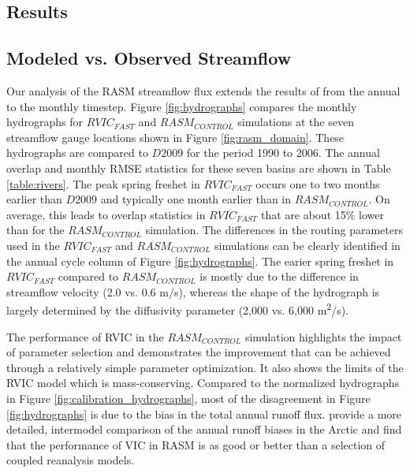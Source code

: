 \documentclass[jgrga, draft]{agutex}
\begin{document}
\begin{article}
\section{Results}
\label{sec:results}

\subsection{Modeled vs. Observed Streamflow}
\label{sec:hydrographs}

Our analysis of the RASM streamflow flux extends the results of \citet{Hamman_2016} from the annual to the monthly timestep.
Figure \ref{fig:hydrographs} compares the monthly hydrographs for $RVIC_{FAST}$ and $RASM_{CONTROL}$ simulations at the seven streamflow gauge locations shown in Figure \ref{fig:rasm_domain}.
These hydrographs are compared to $D2009$ for the period 1990 to 2006.
The annual overlap and monthly RMSE statistics for these seven basins are shown in Table \ref{table:rivers}.
The peak spring freshet in $RVIC_{FAST}$ occurs one to two months earlier than $D2009$ and typically one month earlier than in $RASM_{CONTROL}$.
On average, this leads to overlap statistics in $RVIC_{FAST}$ that are about 15\% lower than for the $RASM_{CONTROL}$ simulation.
The differences in the routing parameters used in the $RVIC_{FAST}$ and $RASM_{CONTROL}$ simulations can be clearly identified in the annual cycle column of Figure \ref{fig:hydrographs}.
The earier spring freshet in $RVIC_{FAST}$ compared to $RASM_{CONTROL}$ is mostly due to the difference in streamflow velocity (2.0 vs. 0.6 m/s), whereas the shape of the hydrograph is largely determined by the diffusivity parameter (2,000 vs. 6,000 m\textsuperscript{2}/s).

The performance of RVIC in the $RASM_{CONTROL}$ simulation highlights the impact of parameter selection and demonstrates the improvement that can be achieved through a relatively simple parameter optimization.
It also shows the limits of the RVIC model which is mass-conserving.
Compared to the normalized hydrographs in Figure \ref{fig:calibration_hydrographs}, most of the disagreement in Figure \ref{fig:hydrographs} is due to the bias in the total annual runoff flux.
\citet{Hamman_2016} provide a more detailed, intermodel comparison of the annual runoff biases in the Arctic and find that the performance of VIC in RASM is as good or better than a selection of coupled reanalysis models.


\end{article}
\end{document}
